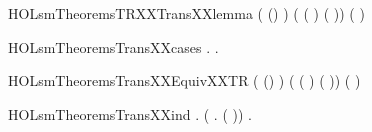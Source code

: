 \newcommand{\HOLsmTheoremsTRXXstrongind}{\UseVerbatim{HOLsmTheoremsTRXXstrongind}}
\begin{SaveVerbatim}{HOLsmTheoremsTRXXTransXXlemma}
\HOLTokenTurnstile{}   ( (\HOLSymConst{::})  )
     (  (  ) (  \HOLSymConst{::})) \HOLSymConst{\HOLTokenImp{}}
      (  )
\end{SaveVerbatim}
\newcommand{\HOLsmTheoremsTRXXTransXXlemma}{\UseVerbatim{HOLsmTheoremsTRXXTransXXlemma}}
\begin{SaveVerbatim}{HOLsmTheoremsTransXXcases}
\HOLTokenTurnstile{} \HOLSymConst{\HOLTokenForall{}}  .     \HOLSymConst{\HOLTokenEquiv{}} \HOLSymConst{\HOLTokenExists{}}.  \HOLSymConst{=}   
\end{SaveVerbatim}
\newcommand{\HOLsmTheoremsTransXXcases}{\UseVerbatim{HOLsmTheoremsTransXXcases}}
\begin{SaveVerbatim}{HOLsmTheoremsTransXXEquivXXTR}
\HOLTokenTurnstile{}   ( (\HOLSymConst{::})  )
     (  (  ) (  \HOLSymConst{::})) \HOLSymConst{\HOLTokenEquiv{}}    (  )
\end{SaveVerbatim}
\newcommand{\HOLsmTheoremsTransXXEquivXXTR}{\UseVerbatim{HOLsmTheoremsTransXXEquivXXTR}}
\begin{SaveVerbatim}{HOLsmTheoremsTransXXind}
\HOLTokenTurnstile{} \HOLSymConst{\HOLTokenForall{}}.
     (\HOLSymConst{\HOLTokenForall{}}  .    (  )) \HOLSymConst{\HOLTokenImp{}}
     \HOLSymConst{\HOLTokenForall{}}  .     \HOLSymConst{\HOLTokenImp{}}    
\end{SaveVerbatim}
